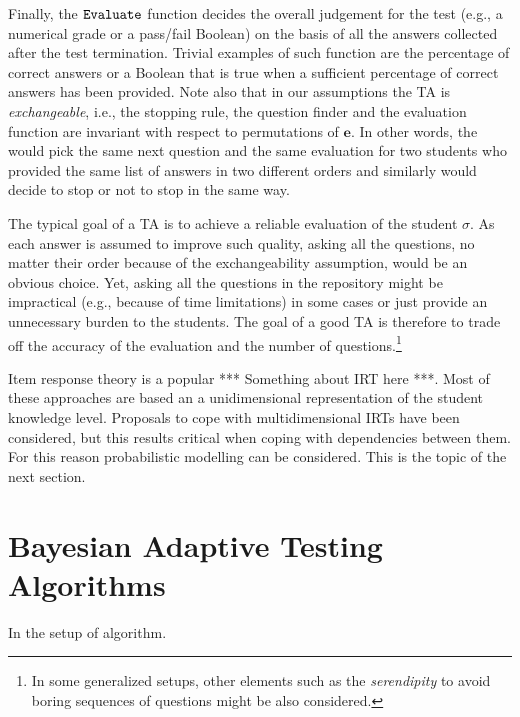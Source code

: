 \documentclass[runningheads]{llncs}
\begin{document}
Finally, the ${\tt Evaluate}$ function decides the overall judgement for the test (e.g., a numerical grade or a pass/fail Boolean) on the basis of all the answers collected after the test termination. Trivial examples of such function are the percentage of correct answers or a Boolean that is true when a sufficient percentage of correct answers has been provided. Note also that in our assumptions the TA is \emph{exchangeable}, i.e., the stopping rule, the question finder and the evaluation function are invariant with respect to permutations of $\bm{e}$. In other words, the would pick the same next question and the same evaluation for two students who provided the same list of answers in two different orders and similarly would decide to stop or not to stop in the same way. 

The typical goal of a TA is to achieve a reliable evaluation of the student $\sigma$. As each answer is assumed to improve such quality, asking all the questions, no matter their order because of the exchangeability assumption, would be an obvious choice. Yet, asking all the questions in the repository might be impractical (e.g., because of time limitations) in some cases or just provide an unnecessary burden to the students. The goal of a good TA is therefore to trade off the accuracy of the evaluation and the number of questions.\footnote{In some generalized setups, other elements such as the \emph{serendipity} to avoid boring sequences of questions might be also considered.}

Item response theory is a popular *** Something about IRT here ***. Most of these approaches are based an a unidimensional representation of the student knowledge level. Proposals to cope with multidimensional IRTs have been considered, but this results critical when coping with dependencies between them. For this reason probabilistic modelling can be considered. This is the topic of the next section.

\section{Bayesian Adaptive Testing Algorithms}
In the setup of algorithm.
\end{document}
